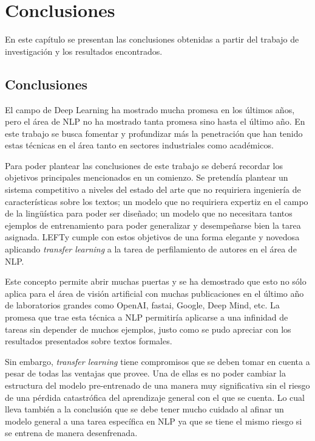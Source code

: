 
\chapter{Conclusiones}

\label{Chapter6} %

En este capítulo se presentan las conclusiones obtenidas a partir del trabajo de investigación y los resultados encontrados.

\section{Conclusiones}

El campo de Deep Learning ha mostrado mucha promesa en los últimos años, pero el área de NLP no ha mostrado tanta promesa sino hasta el último año. En este trabajo se busca fomentar y profundizar más la penetración que han tenido estas técnicas en el área tanto en sectores industriales como académicos.

Para poder plantear las conclusiones de este trabajo se deberá recordar los objetivos principales mencionados en un comienzo. Se pretendía plantear un sistema competitivo a niveles del estado del arte que no requiriera ingeniería de características sobre los textos; un modelo que no requiriera expertiz en el campo de la lingüística para poder ser diseñado; un modelo que no necesitara tantos ejemplos de entrenamiento para poder generalizar y desempeñarse bien la tarea asignada. LEFTy cumple con estos objetivos de una forma elegante y novedosa aplicando \textit{transfer learning} a la tarea de perfilamiento de autores en el área de NLP.

Este concepto permite abrir muchas puertas y se ha demostrado que esto no sólo aplica para el área de visión artificial con muchas publicaciones en el último año de laboratorios grandes como OpenAI, fastai, Google, Deep Mind, etc. La promesa que trae esta técnica a NLP permitiría aplicarse a una infinidad de tareas sin depender de muchos ejemplos, justo como se pudo apreciar con los resultados presentados sobre textos formales.

Sin embargo, \textit{transfer learning} tiene compromisos que se deben tomar en cuenta a pesar de todas las ventajas que provee. Una de ellas es no poder cambiar la estructura del modelo pre-entrenado de una manera muy significativa sin el riesgo de una pérdida catastrófica del aprendizaje general con el que se cuenta. Lo cual lleva también a la conclusión que se debe tener mucho cuidado al afinar un modelo general a una tarea específica en NLP ya que se tiene el mismo riesgo si se entrena de manera desenfrenada.

